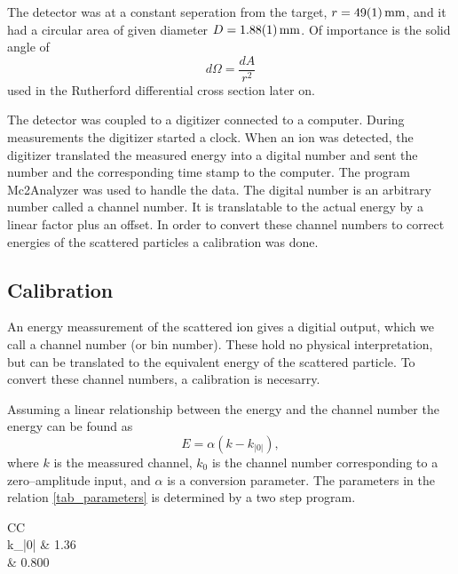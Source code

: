 The detector was at a constant seperation from the target, $r =
\SI{49\pm1}{\milli\meter}$, and it had a circular area of given diameter
$D=\SI{1.88 \pm 0.01}{\milli\meter}$. Of importance is the solid angle of 
\begin{equation}
d\Omega = \frac{dA}{r^2}
\end{equation}
used in the Rutherford differential cross section later on.

The detector was coupled to a digitizer connected to a computer. During
measurements the digitizer started a clock. When an ion was detected, the
digitizer translated the measured energy into a digital number and sent the
number and the corresponding time stamp to the computer.  The program
Mc2Analyzer was used to handle the data. The digital number is an arbitrary
number called a channel number. It is translatable to the actual energy by a
linear factor plus an offset. In order to convert these channel numbers to
correct energies of the scattered particles a calibration was done.

\subsection{Calibration}
An energy meassurement of the scattered ion gives a digitial output, which we call
a channel number (or bin number). These hold no physical interpretation, but
can be translated to the equivalent energy of the scattered particle. To
convert these channel numbers, a calibration is necesarry. 

Assuming a linear relationship between the energy and the channel number the
energy can be found as
\begin{equation}
    E = \alpha(k - k_|0|), \label{eq_calibration}
\end{equation}
where $k$ is the meassured channel, $k_0$ is the channel number corresponding to
a zero--amplitude input, and $\alpha$ is a conversion parameter.
The parameters in the relation \cref{tab_parameters} is determined by a two
step program.

\begin{table}[b]
\centering
\caption{The values of the parameters, used to convert channel numbers to
energies.}
\begin{tabular}{CC}
\toprule
{}\\
\midrule
k_|0| & 1.36 \\
\alpha & 0.800  \\
\bottomrule
\end{tabular}

\label{tab_parameters}
\end{table}

